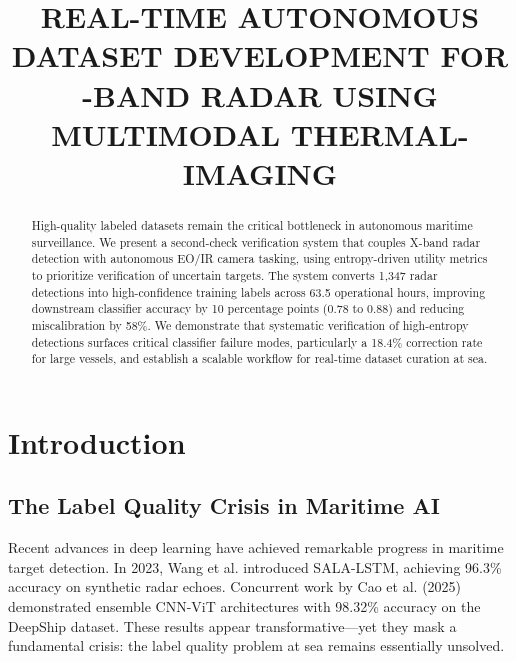 \documentclass[conf]{asmeconf}
\title{REAL-TIME AUTONOMOUS DATASET DEVELOPMENT FOR \NoCaseChange{X}-BAND RADAR USING MULTIMODAL THERMAL-\NoCaseChange{RGB} IMAGING}
\begin{document}
\maketitle



\begin{abstract}
High-quality labeled datasets remain the critical bottleneck in autonomous maritime surveillance. We present a second-check verification system that couples X-band radar detection with autonomous EO/IR camera tasking, using entropy-driven utility metrics to prioritize verification of uncertain targets. The system converts 1,347 radar detections into high-confidence training labels across 63.5 operational hours, improving downstream classifier accuracy by 10 percentage points (0.78 to 0.88) and reducing miscalibration by 58\%. We demonstrate that systematic verification of high-entropy detections surfaces critical classifier failure modes, particularly a 18.4\% correction rate for large vessels, and establish a scalable workflow for real-time dataset curation at sea.
\end{abstract}

\begin{nomenclature}
\end{nomenclature}

\section{Introduction}

\subsection{The Label Quality Crisis in Maritime AI}

Recent advances in deep learning have achieved remarkable progress in maritime target detection. In 2023, Wang et al. \cite{Wang2023SALALSTM} introduced SALA-LSTM, achieving 96.3\% accuracy on synthetic radar echoes. Concurrent work by Cao et al. (2025) \cite{Cao2025VesselCNN} demonstrated ensemble CNN-ViT architectures with 98.32\% accuracy on the DeepShip dataset. These results appear transformative---yet they mask a fundamental crisis: the label quality problem at sea remains essentially unsolved.
\end{document}
